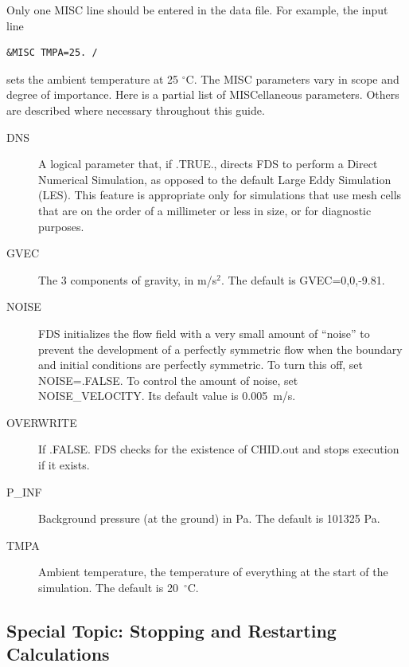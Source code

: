 \documentclass[11pt]{book}
\begin{document}
Only one {\ct MISC} line should be entered in the data file. For example, the input line
\begin{lstlisting}
&MISC TMPA=25. /
\end{lstlisting}
sets the ambient temperature at 25 $^\circ$C. The {\ct MISC} parameters vary in scope and degree of importance. Here is a partial list of {\ct MISC}ellaneous parameters. Others are described where necessary throughout this guide.
\begin{description}
\item[{\ct DNS}] A logical parameter that, if {\ct .TRUE.}, directs FDS to perform a Direct Numerical Simulation,
as opposed to the default Large Eddy Simulation (LES). This feature is appropriate only for simulations that use mesh cells that are
on the order of a millimeter or less in size, or for diagnostic purposes.
\item[{\ct GVEC}] The 3 components of gravity, in m/s$^2$. The default is {\ct GVEC=0,0,-9.81}.
\item[{\ct NOISE}] FDS initializes the flow field with a very small amount of ``noise'' to prevent the
development of a perfectly symmetric flow when the boundary
and initial conditions are perfectly symmetric. To turn this off, set {\ct NOISE=.FALSE.} To control the amount of noise, set {\ct NOISE\_VELOCITY}. Its default value is 0.005~m/s.
\item[{\ct OVERWRITE}] If {\ct .FALSE.} FDS checks for the existence of  {\ct CHID.out} and stops execution if it exists.
\item[{\ct P\_INF}] Background pressure (at the ground) in Pa. The default is 101325 Pa.
\item[{\ct TMPA}] Ambient temperature, the temperature of everything at the start of the simulation. The default is 20~$^\circ$C.
\end{description}





\subsection{Special Topic: Stopping and Restarting Calculations}
\label{info:restart}
\end{document}
